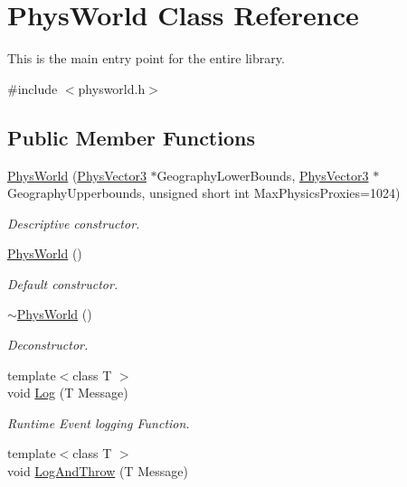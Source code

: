 \hypertarget{classPhysWorld}{
\section{PhysWorld Class Reference}
\label{db/df5/classPhysWorld}
}


This is the main entry point for the entire library.  


{\ttfamily \#include $<$physworld.h$>$}\subsection*{Public Member Functions}
\begin{DoxyCompactItemize}
\item 
\hyperlink{classPhysWorld_a3228c98369082139722d3c918d735e6c}{PhysWorld} (\hyperlink{classPhysVector3}{PhysVector3} $\ast$GeographyLowerBounds, \hyperlink{classPhysVector3}{PhysVector3} $\ast$GeographyUpperbounds, unsigned short int MaxPhysicsProxies=1024)
\begin{DoxyCompactList}\small\item\em Descriptive constructor. \item\end{DoxyCompactList}\item 
\hyperlink{classPhysWorld_a6ded8026b0cd72e7877830698197adf0}{PhysWorld} ()
\begin{DoxyCompactList}\small\item\em Default constructor. \item\end{DoxyCompactList}\item 
\hyperlink{classPhysWorld_acdfe3b4c1c236860dc7dff945cfe5b07}{$\sim$PhysWorld} ()
\begin{DoxyCompactList}\small\item\em Deconstructor. \item\end{DoxyCompactList}\item 
{\footnotesize template$<$class T $>$ }\\void \hyperlink{classPhysWorld_a5e9fead1c3100f5dbd5ca985b82b85ea}{Log} (T Message)
\begin{DoxyCompactList}\small\item\em Runtime Event logging Function. \item\end{DoxyCompactList}\item 
{\footnotesize template$<$class T $>$ }\\void \hyperlink{classPhysWorld_a1c2aeaed2a89821a4545db854da33ab8}{LogAndThrow} (T Message)

\end{DoxyCompactItemize}
